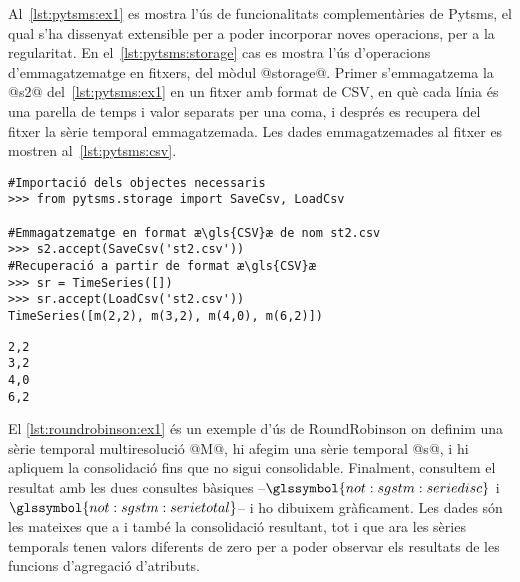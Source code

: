 Al~\autoref{lst:pytsms:ex1} es mostra l'ús de funcionalitats
complementàries de Pytsms, el qual s'ha dissenyat extensible per a
poder incorporar noves operacions, per a la regularitat.  En
el~\autoref{lst:pytsms:storage} cas es mostra l'ús d'operacions
d'emmagatzematge en fitxers, del mòdul @storage@. Primer s'emmagatzema
la @s2@ del~\autoref{lst:pytsms:ex1} en un fitxer amb format de
\gls{CSV}, en què cada línia és una parella de temps i valor separats
per una coma, i després es recupera del fitxer la sèrie temporal
emmagatzemada. Les dades emmagatzemades al fitxer es mostren
al~\autoref{lst:pytsms:csv}.
\begin{lstlisting}[style=py,caption=Operacions complementàries de Pytsms per a l'emmagatzematge,label=lst:pytsms:storage]
#Importació dels objectes necessaris
>>> from pytsms.storage import SaveCsv, LoadCsv

#Emmagatzematge en format æ\gls{CSV}æ de nom st2.csv
>>> s2.accept(SaveCsv('st2.csv'))
#Recuperació a partir de format æ\gls{CSV}æ
>>> sr = TimeSeries([])
>>> sr.accept(LoadCsv('st2.csv'))
TimeSeries([m(2,2), m(3,2), m(4,0), m(6,2)])
\end{lstlisting}

\begin{lstlisting}[style=file,caption=Dades del fitxer st2.csv,label=lst:pytsms:csv]
2,2
3,2
4,0
6,2
\end{lstlisting}






El \autoref{lst:roundrobinson:ex1} és un exemple d'ús de RoundRobinson
on definim una sèrie temporal multiresolució @M@, hi afegim una sèrie
temporal @s@, i hi apliquem la consolidació fins que no sigui
consolidable. Finalment, consultem el resultat amb les dues consultes
bàsiques --$\glssymbol{not:sgstm:seriedisc}$ i
$\glssymbol{not:sgstm:serietotal}$-- i ho dibuixem gràficament.  Les
dades són les mateixes que a  i també la
consolidació resultant, tot i que ara les sèries temporals tenen
valors diferents de zero per a poder observar els resultats de les
funcions d'agregació d'atributs.



